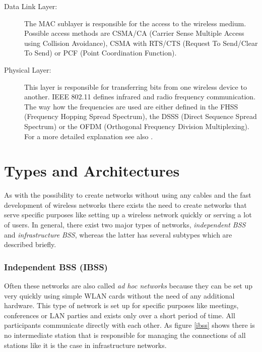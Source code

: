 \begin{description}
    \item[Data Link Layer:] The MAC sublayer is responsible for the access to the wireless medium. Possible access methods are CSMA/CA (Carrier Sense Multiple Access using Collision Avoidance), CSMA with RTS/CTS (Request To Send/Clear To Send) or PCF (Point Coordination Function).
	\item[Physical Layer:] This layer is responsible for transferring bits from one wireless device to another. IEEE 802.11 defines infrared and radio frequency communication. The way how the frequencies are used are either defined in the FHSS (Frequency Hopping Spread Spectrum), the DSSS (Direct Sequence Spread Spectrum) or the OFDM (Orthogonal Frequency Division Multiplexing). For a more detailed explanation see also \cite[p.85-87]{mobile_computing}.
\end{description}


\section{Types and Architectures}

As with the possibility to create networks without using any cables and the fast development of wireless networks there exists the need to create networks that serve specific purposes like setting up a wireless network quickly or serving a lot of users. In general, there exist two major types of networks, {\em independent \ac{BSS}} and {\em infrastructure BSS}, whereas the latter has several subtypes which are described briefly.

\subsubsection{Independent BSS (IBSS)}

Often these networks are also called {\em ad hoc networks} because they can be set up very quickly using simple WLAN cards without the need of any additional hardware. This type of network is set up for specific purposes like meetings, conferences or LAN parties and exists only over a short period of time. All participants communicate directly with each other. As figure \ref{ibss} shows there is no intermediate station that is responsible for managing the connections of all stations like it is the case in infrastructure networks.

